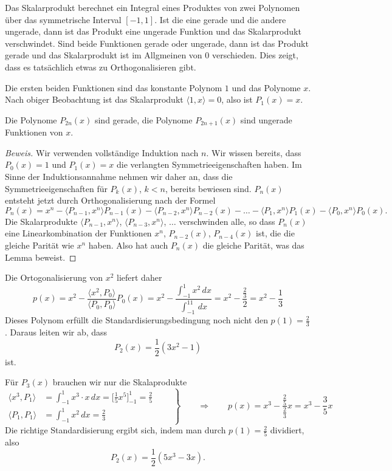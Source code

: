 Das Skalarprodukt berechnet ein Integral eines Produktes von zwei
Polynomen über das symmetrische Interval $[-1,1]$.
Ist die eine gerade und die andere ungerade, dann ist das
Produkt eine ungerade Funktion und das Skalarprodukt verschwindet.
Sind beide Funktionen gerade oder ungerade, dann ist das Produkt
gerade und das Skalarprodukt ist im Allgmeinen von $0$ verschieden.
Dies zeigt, dass es tatsächlich etwas zu Orthogonalisieren gibt.

Die ersten beiden Funktionen sind das konstante Polynom $1$ und
das Polynome $x$.
Nach obiger Beobachtung ist das Skalarprodukt $\langle 1,x\rangle=0$,
also ist $P_1(x)=x$.

\begin{lemma}
Die Polynome $P_{2n}(x)$ sind gerade, die Polynome $P_{2n+1}(x)$ sind
ungerade Funktionen von $x$.
\end{lemma}

\begin{proof}[Beweis]
Wir verwenden vollständige Induktion nach $n$.
Wir wissen bereits, dass $P_0(x)=1$ und $P_1(x)=x$ die verlangten
Symmetrieeigenschaften haben.
Im Sinne der Induktionsannahme nehmen wir daher an, dass die
Symmetrieeigenschaften für $P_k(x)$, $k<n$, bereits bewiesen sind.
$P_n(x)$ entsteht jetzt durch Orthogonalisierung nach der Formel
\[
P_n(x)
=
x^n
-
\langle P_{n-1},x^n\rangle P_{n-1}(x)
-
\langle P_{n-2},x^n\rangle P_{n-2}(x)
-\dots-
\langle P_1,x^n\rangle P_1(x)
-
\langle P_0,x^n\rangle P_0(x).
\]
Die Skalarprodukte
$\langle P_{n-1},x^n\rangle$,
$\langle P_{n-3},x^n\rangle$, $\dots$ verschwinden alle, so dass
$P_n(x)$ eine Linearkombination der Funktionen $x^n$, $P_{n-2}(x)$,
$P_{n-4}(x)$ ist, die die gleiche Parität wie $x^n$ haben.
Also hat auch $P_n(x)$ die gleiche Parität, was das Lemma beweist.
\end{proof}

Die Ortogonalisierung von $x^2$ liefert daher
\[
p(x) = x^2
-
\frac{\langle x^2,P_0\rangle}{\langle P_0,P_0\rangle} P_0(x)
=
x^2 - \frac{\int_{-1}^1x^2\,dx}{\int_{-1}^11\,dx}
=
x^2 - \frac{\frac{2}{3}}{2}=x^2-\frac13
\]
Dieses Polynom erfüllt die Standardisierungsbedingung noch 
nicht den $p(1)=\frac23$.
Daraus leiten wir ab, dass
\[
P_2(x) = \frac12(3x^2-1)
\]
ist.

Für $P_3(x)$ brauchen wir nur die Skalaprodukte
\[
\left.
\begin{aligned}
\langle x^3,P_1\rangle
&=
\int_{-1}^1  x^3\cdot x\,dx
=
\biggl[\frac15x^5\biggr]_{-1}^1
=
\frac25
\qquad
\\
\langle P_1,P_1\rangle
&=
\int_{-1}^1 x^2\,dx
=
\frac23
\end{aligned}
\right\}
\qquad
\Rightarrow
\qquad
p(x) = x^3 - \frac{\frac25}{\frac23}x=x^3-\frac{3}{5}x
\]
Die richtige Standardisierung ergibt sich,
indem man durch $p(1)=\frac25$ dividiert, also
\[
P_2(x) = \frac12(5x^3-3x).
\]


